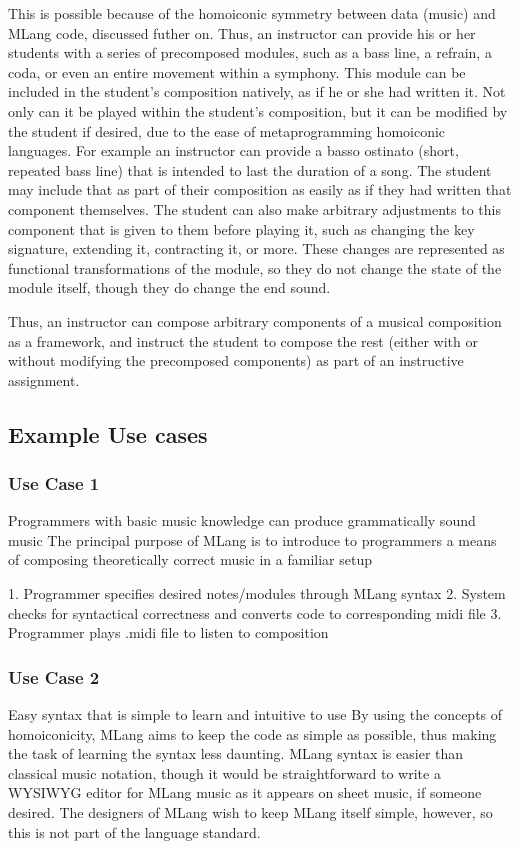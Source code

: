 \documentclass{article}
\begin{document}
This is possible because of the homoiconic symmetry between data (music) and MLang code, discussed futher on. Thus, an instructor can provide his or her students with a series of precomposed modules, such as a bass line, a refrain, a coda, or even an entire movement within a symphony. This module can be included in the student’s composition natively, as if he or she had written it. Not only can it be played within the student’s composition, but it can be modified by the student if desired, due to the ease of metaprogramming homoiconic languages. For example an instructor can provide a basso ostinato (short, repeated bass line) that is intended to last the duration of a song. The student may include that as part of their composition as easily as if they had written that component themselves. The student can also make arbitrary adjustments to this component that is given to them before playing it, such as changing the key signature, extending it, contracting it, or more. These changes are represented as functional transformations of the module, so they do not change the state of the module itself, though they do change the end sound.


Thus, an instructor can compose arbitrary components of a musical composition as a framework, and instruct the student to compose the rest (either with or without modifying the precomposed components) as part of an instructive assignment.


\subsection{Example Use cases}

\subsubsection{Use Case 1}
Programmers with basic music knowledge can produce grammatically sound music
The principal purpose of MLang is to introduce to programmers a means of composing theoretically correct music in a familiar setup


1. Programmer specifies desired notes/modules through MLang syntax
2. System checks for syntactical correctness and converts code to corresponding midi file
3. Programmer plays .midi file to listen to composition








\subsubsection{Use Case 2}
 Easy syntax that is simple to learn and intuitive to use
By using the concepts of homoiconicity, MLang aims to keep the code as simple as possible, thus making the task of learning the syntax less daunting. MLang syntax is easier than classical music notation, though it would be straightforward to write a WYSIWYG editor for MLang music as it appears on sheet music, if someone desired. The designers of MLang wish to keep MLang itself simple, however, so this is not part of the language standard.
\end{document}
